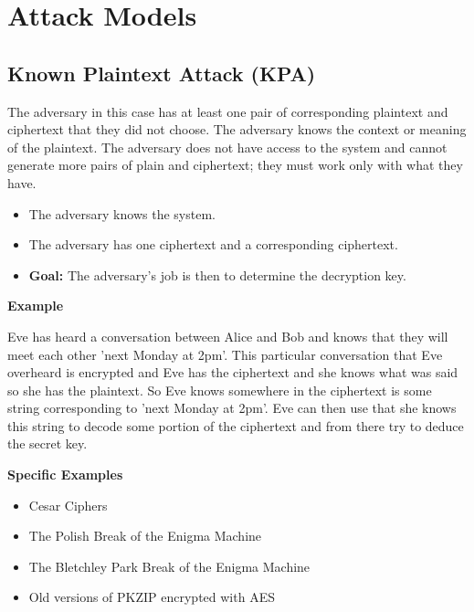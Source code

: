 \section{Attack Models}


\subsection{Known Plaintext Attack (KPA)}

The adversary in this case has at least one pair of corresponding plaintext and ciphertext that they did not choose.
The adversary knows the context or meaning of the plaintext.
The adversary does not have access to the system and cannot generate more pairs of plain and ciphertext; they must work only with what they have.


\begin{itemize}
\item The adversary knows the system.
\item The adversary has one ciphertext and a corresponding ciphertext.
\item \textbf{Goal:} The adversary’s job is then to determine the decryption key.
\end{itemize}



\textbf{Example}


Eve has heard a conversation between Alice and Bob and knows that they will meet each other 'next Monday at 2pm'.
This particular conversation that Eve overheard is encrypted and Eve has the ciphertext and she knows what was said so she has the plaintext. 
So Eve knows somewhere in the ciphertext is some string corresponding to 'next Monday at 2pm'. 
Eve can then use that she knows this string to decode some portion of the ciphertext and from there try to deduce the secret key. 


\textbf{Specific Examples}


\begin{itemize}
\item Cesar Ciphers
\item The Polish Break of the Enigma Machine
\item The Bletchley Park Break of the Enigma Machine
\item Old versions of PKZIP encrypted with AES
\end{itemize}

